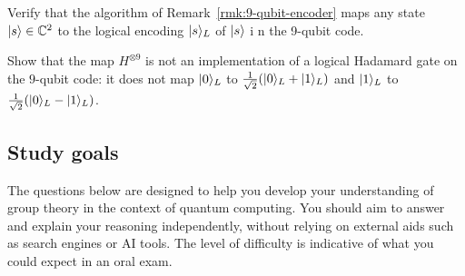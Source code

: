 \documentclass[a4paper, oneside, 12pt]{amsart}
\begin{document}
\begin{exercise}
  Verify that the algorithm of Remark~\ref{rmk:9-qubit-encoder} maps any state \(\lvert s\rangle \in \mathbb{C}^{2}\) to
  the logical encoding \(\lvert s\rangle_{L}\) of \(\lvert s\rangle\) i n the 9-qubit code.
\end{exercise}

\begin{exercise}
 Show that the map \(H^{\otimes 9}\) is not an implementation of a logical Hadamard gate on the \(9\)-qubit code: it does not map \(\lvert0\rangle_{L}\) to \(\tfrac{1}{\sqrt{2}} (\lvert0\rangle_{L}+ \lvert1\rangle_{L})\)  and \(\lvert1\rangle_{L}\) to \(\tfrac{1}{\sqrt{2}} (\lvert0\rangle_{L}- \lvert1\rangle_{L})\).
\end{exercise}

\cleardoublepage
\subsection{Study goals}\label{sec:groups-study-goals}
The questions below are designed to help you develop your understanding of group theory in the context of quantum computing.
You should aim to answer and explain your reasoning independently, without relying on external aids such as search engines or AI tools.
The level of difficulty is indicative of what you could expect in an oral exam.
\end{document}
